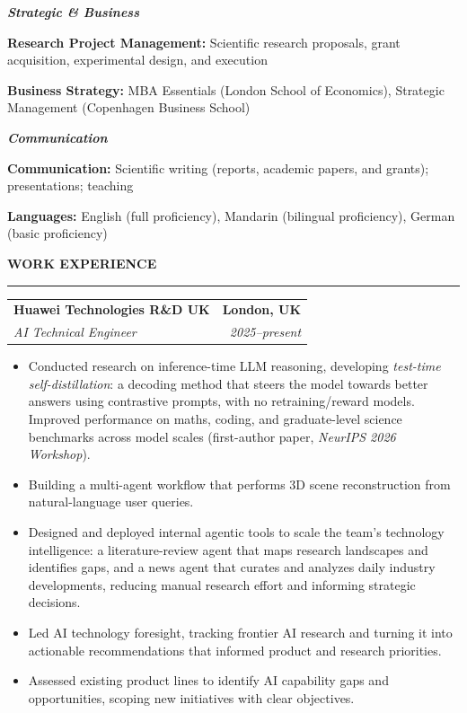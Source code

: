 \documentclass[10pt,a4paper]{article}
\makeatletter
\newcommand{\cvsection}[1]{%
  \vspace{0.8em}%
  {\large\bfseries\color{heading}#1}\par
  \vspace{-0.35em}%
  {\color{heading}\rule{\textwidth}{0.6pt}}\par
  \vspace{0.1em}%
}
\newcommand{\entry}[4]{%
  \begin{tabularx}{\textwidth}{@{}Xr@{}}
    \textbf{#1} & \textbf{#2} \\
    \textit{#3} & \textit{#4}
  \end{tabularx}
}
\makeatother
\begin{document}
{\centering\textbf{\textit{Strategic \& Business}}\par}

\textbf{Research Project Management:} Scientific research proposals, grant acquisition, experimental design, and execution

\textbf{Business Strategy:} MBA Essentials (London School of Economics), Strategic Management (Copenhagen Business School)

{\centering\textbf{\textit{Communication}}\par}

\textbf{Communication:} Scientific writing (reports, academic papers, and grants); presentations; teaching

\textbf{Languages:} English (full proficiency), Mandarin (bilingual proficiency), German (basic proficiency)

\cvsection{WORK EXPERIENCE}

\entry{Huawei Technologies R\&D UK}{London, UK}{AI Technical Engineer}{2025--present}
\begin{itemize}
   \item Conducted research on inference-time LLM reasoning, developing \textit{test-time self-distillation}: a decoding method that steers the model towards better answers using contrastive prompts, with no retraining/reward models. Improved performance on maths, coding, and graduate-level science benchmarks across model scales (first-author paper, \textit{NeurIPS 2026 Workshop}).
  \item Building a multi-agent workflow that performs 3D scene reconstruction from natural-language user queries.
  \item Designed and deployed internal agentic tools to scale the team's technology intelligence: a literature-review agent that maps research landscapes and identifies gaps, and a news agent that curates and analyzes daily industry developments, reducing manual research effort and informing strategic decisions.
  \item Led AI technology foresight, tracking frontier AI research and turning it into actionable recommendations that informed product and research priorities.
  \item Assessed existing product lines to identify AI capability gaps and opportunities, scoping new initiatives with clear objectives.
\end{itemize}
\end{document}
